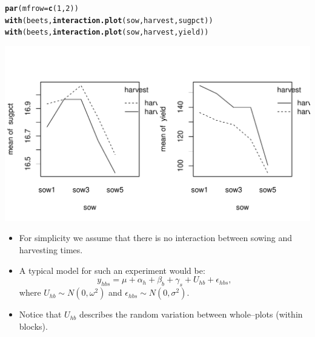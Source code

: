 \documentclass[compress]{beamer}\usepackage[]{graphicx}\usepackage[]{color}
\makeatletter
\def\maxwidth{ %
  \ifdim\Gin@nat@width>\linewidth
    \linewidth
  \else
    \Gin@nat@width
  \fi
}
\newcommand{\hlnum}[1]{\textcolor[rgb]{0.686,0.059,0.569}{#1}}%
\newcommand{\hlstd}[1]{\textcolor[rgb]{0.345,0.345,0.345}{#1}}%
\newcommand{\hlkwc}[1]{\textcolor[rgb]{0.333,0.667,0.333}{#1}}%
\newcommand{\hlkwd}[1]{\textcolor[rgb]{0.737,0.353,0.396}{\textbf{#1}}}%
\newenvironment{kframe}{%
 \def\at@end@of@kframe{}%
 \ifinner\ifhmode%
  \def\at@end@of@kframe{\end{minipage}}%
  \begin{minipage}{\columnwidth}%
 \fi\fi%
 \def\FrameCommand##1{\hskip\@totalleftmargin \hskip-\fboxsep
 \colorbox{shadecolor}{##1}\hskip-\fboxsep
     \hskip-\linewidth \hskip-\@totalleftmargin \hskip\columnwidth}%
 \MakeFramed {\advance\hsize-\width
   \@totalleftmargin\z@ \linewidth\hsize
   \@setminipage}}%
 {\par\unskip\endMakeFramed%
 \at@end@of@kframe}
\newenvironment{knitrout}{}{} %
\newenvironment{sframe}
{\begin{frame} [containsverbatim] }
  {\end{frame}}
\makeatother
\begin{document}
\begin{sframe}

\begin{knitrout}\scriptsize
{}\color{fgcolor}\begin{kframe}
\begin{alltt}
\hlkwd{par}\hlstd{(}\hlkwc{mfrow}\hlstd{=}\hlkwd{c}\hlstd{(}\hlnum{1}\hlstd{,}\hlnum{2}\hlstd{))}
\hlkwd{with}\hlstd{(beets,} \hlkwd{interaction.plot}\hlstd{(sow, harvest, sugpct))}
\hlkwd{with}\hlstd{(beets,} \hlkwd{interaction.plot}\hlstd{(sow, harvest, yield))}
\end{alltt}
\end{kframe}
\includegraphics[width=\maxwidth]{fig/tartu-unnamed-chunk-6-1} 

\end{knitrout}
\end{sframe}


\begin{sframe}


  \begin{itemize}
  \item 
    For simplicity we assume that there is no interaction between sowing
    and harvesting times.

  \item A typical model for such an experiment would be:
    \begin{equation}
      \label{eq:beetsmodel1}
      y_{hbs} = \mu + \alpha_h + \beta_b + \gamma_s + U_{hb} + \epsilon_{hbs},
    \end{equation}
    where $U_{hb} \sim N(0,\omega^2)$ and $\epsilon_{hbs}\sim
    N(0,\sigma^2)$.
    

  \item Notice that $U_{hb}$ describes the random variation
    between whole--plots (within blocks).

  \end{itemize}

\end{sframe}
\end{document}
